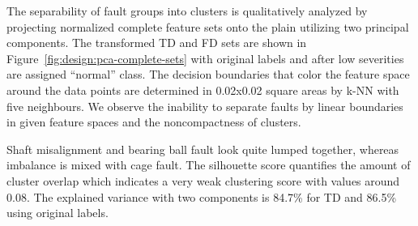 The separability of fault groups into clusters is qualitatively analyzed by projecting normalized complete feature sets onto the plain utilizing two principal components. The transformed TD and FD sets are shown in Figure~\ref{fig:design:pca-complete-sets} with original labels and after low severities are assigned ``normal'' class. The decision boundaries that color the feature space around the data points are determined in 0.02x0.02 square areas by k-NN with five neighbours. We observe the inability to separate faults by linear boundaries in given feature spaces and the noncompactness of clusters.

Shaft misalignment and bearing ball fault look quite lumped together, whereas imbalance is mixed with cage fault. The silhouette score quantifies the amount of cluster overlap which indicates a very weak clustering score with values around 0.08. The explained variance with two components is 84.7\% for TD and 86.5\% using original labels.

